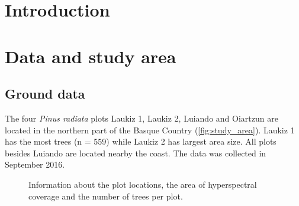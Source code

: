 \documentclass[review]{elsarticle}
\begin{document}
\section{Introduction}
\label{sec:intro}

\section{Data and study area}

\subsection{Ground data}

The four \textit{Pinus radiata} plots Laukiz 1, Laukiz 2, Luiando and Oiartzun are located in the northern part of the Basque Country (\autoref{fig:study_area}).
Laukiz 1 has the most trees (n = 559) while Laukiz 2 has largest area size.
All plots besides Luiando are located nearby the coast.
The data was collected in September 2016.


\begin{figure} [t!]
	\begin{center}
		\caption{Information about the plot locations, the area of hyperspectral coverage and the number of trees per plot.}
		\label{fig:study_area}
	\end{center}
\end{figure}
\end{document}

